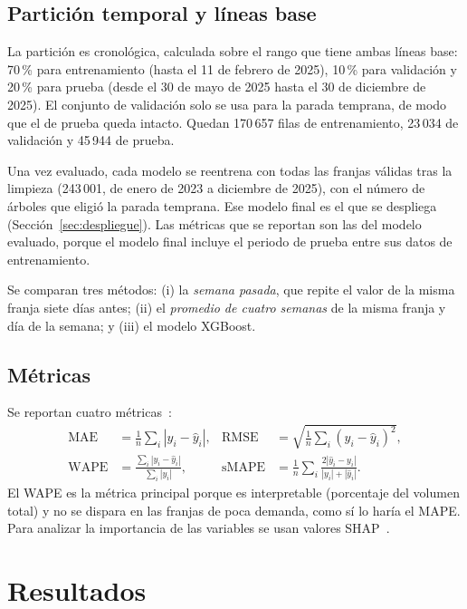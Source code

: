 \documentclass[11pt,a4paper]{article}
\begin{document}
\subsection{Partición temporal y líneas base}

La partición es cronológica, calculada sobre el rango que tiene ambas líneas base: 70\,\% para entrenamiento (hasta el 11 de febrero de 2025), 10\,\% para validación y 20\,\% para prueba (desde el 30 de mayo de 2025 hasta el 30 de diciembre de 2025). El conjunto de validación solo se usa para la parada temprana, de modo que el de prueba queda intacto. Quedan 170\,657 filas de entrenamiento, 23\,034 de validación y 45\,944 de prueba.

Una vez evaluado, cada modelo se reentrena con todas las franjas válidas tras la limpieza (243\,001, de enero de 2023 a diciembre de 2025), con el número de árboles que eligió la parada temprana. Ese modelo final es el que se despliega (Sección~\ref{sec:despliegue}). Las métricas que se reportan son las del modelo evaluado, porque el modelo final incluye el periodo de prueba entre sus datos de entrenamiento.

Se comparan tres métodos: (i) la \emph{semana pasada}, que repite el valor de la misma franja siete días antes; (ii) el \emph{promedio de cuatro semanas} de la misma franja y día de la semana; y (iii) el modelo XGBoost.

\subsection{Métricas}

Se reportan cuatro métricas~\cite{hyndman2006another}:
\begin{align}
\mathrm{MAE} &= \frac{1}{n}\sum_i |y_i-\hat y_i|, &
\mathrm{RMSE} &= \sqrt{\frac{1}{n}\sum_i (y_i-\hat y_i)^2},\\
\mathrm{WAPE} &= \frac{\sum_i |y_i-\hat y_i|}{\sum_i |y_i|}, &
\mathrm{sMAPE} &= \frac{1}{n}\sum_i \frac{2|\hat y_i-y_i|}{|y_i|+|\hat y_i|}.
\end{align}
El WAPE es la métrica principal porque es interpretable (porcentaje del volumen total) y no se dispara en las franjas de poca demanda, como sí lo haría el MAPE. Para analizar la importancia de las variables se usan valores SHAP~\cite{lundberg2017unified}.

\section{Resultados}
\end{document}
